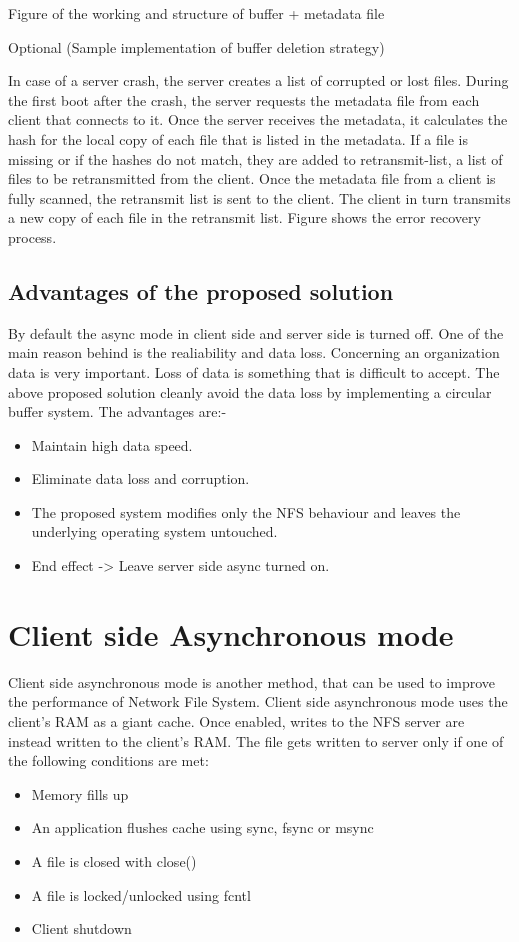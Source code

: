 \documentclass[conference]{IEEEtran}
\begin{document}
Figure of the working and structure of buffer + metadata file

Optional (Sample implementation of buffer deletion strategy)

In case of a server crash, the server creates a list of corrupted or lost
files. During the first boot after the crash, the server requests the
metadata file from each client that connects to it. Once the server receives
the metadata, it calculates the hash for the local copy of each file that
is listed in the metadata. If a file is missing or if the hashes do not
match, they are added to retransmit-list, a list of files to be 
retransmitted from the client. Once the metadata file from a client is fully
scanned, the retransmit list is sent to the client. The client in turn
transmits a new copy of each file in the retransmit list. Figure shows the
error recovery process.

\subsection{Advantages of the proposed solution}
By default the async mode in client side and server side is turned off. One of
the main reason behind is the realiability and data loss. Concerning an
organization data is very important. Loss of data is something that is
difficult to accept. The above proposed solution cleanly avoid the data loss 
by implementing a circular buffer system.
The advantages are:-
\begin{itemize}
\item Maintain high data speed.
\item Eliminate data loss and corruption.
\item The proposed system modifies only the NFS behaviour and leaves the underlying operating system untouched.
\item End effect -> Leave server side async turned on.
\end{itemize}

\section{Client side Asynchronous mode}
Client side asynchronous mode is another method, that can be used to improve
the performance of Network File System. Client side asynchronous mode uses
the client's RAM as a giant cache. Once enabled, writes to the NFS server
are instead written to the client's RAM. The file gets written to server 
only if one of the following conditions are met:
\begin{itemize}
\item Memory fills up
\item An application flushes cache using sync, fsync or msync
\item A file is closed with close()
\item A file is locked/unlocked using fcntl
\item Client shutdown
\end{itemize}
\end{document}
